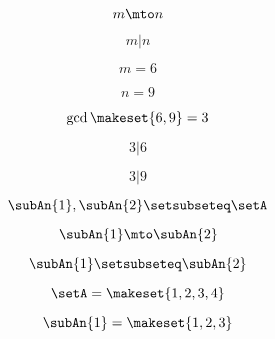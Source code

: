 {\begin{forslides}
        \begin{equation}
            \label{eq:feedback-016}
            m \mto n
        \end{equation}

        \begin{equation}
            \label{eq:feedback-017}
            m | n
        \end{equation}

        \begin{equation}
            \label{eq:feedback-018}
            m = 6
        \end{equation}

        \begin{equation}
            \label{eq:feedback-019}
            n = 9
        \end{equation}

        \begin{equation}
            \label{eq:feedback-020}
            \gcd \makeset{6, 9 } = 3
        \end{equation}

        \begin{equation}
            \label{eq:feedback-021}
            3 | 6
        \end{equation}

        \begin{equation}
            \label{eq:feedback-022}
            3 | 9
        \end{equation}

        \begin{equation}
            \label{eq:feedback-023}
            \subAn{1}, \subAn{2} \setsubseteq \setA
        \end{equation}

        \begin{equation}
            \label{eq:feedback-024}
            \subAn{1} \mto \subAn{2}
        \end{equation}

        \begin{equation}
            \label{eq:feedback-025}
            \subAn{1} \setsubseteq \subAn{2}
        \end{equation}

        \begin{equation}
            \label{eq:feedback-026}
            \setA = \makeset{ 1, 2, 3, 4 }
        \end{equation}

        \begin{equation}
            \label{eq:feedback-027}
            \subAn{1} = \makeset{ 1, 2, 3 }
        \end{equation}


\end{forslides}}
